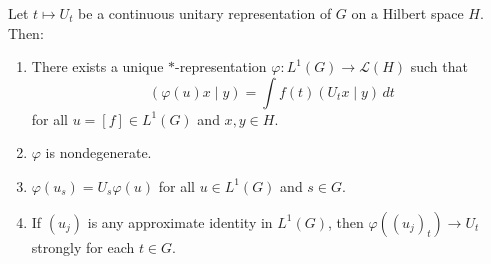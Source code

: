 \begin{theorem}
Let $t \mapsto U_t$ be a continuous unitary representation of $G$ on a Hilbert space $H$. Then:
\begin{enumerate}
\item[(1)] There exists a unique $*$-representation $\varphi: L^1(G) \to \mathcal{L}(H)$ such that
$$(\varphi(u)x \mid y) = \int f(t)(U_t x \mid y)\, dt$$
for all $u = [f] \in L^1(G)$ and $x, y \in H$.
\item[(2)] $\varphi$ is nondegenerate.
\item[(3)] $\varphi(u_s) = U_s \varphi(u)$ for all $u \in L^1(G)$ and $s \in G$.
\item[(4)] If $(u_j)$ is any approximate identity in $L^1(G)$, then $\varphi((u_j)_t) \to U_t$ strongly for each $t \in G$.
\end{enumerate}
\end{theorem}
